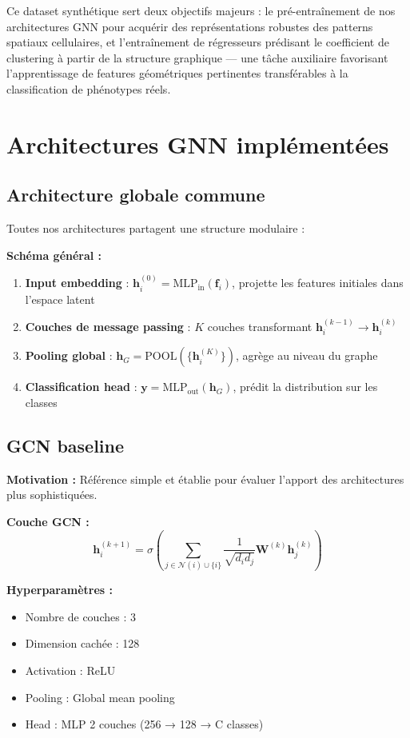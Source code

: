 Ce dataset synthétique sert deux objectifs majeurs : le pré-entraînement de nos architectures GNN pour acquérir des représentations robustes des patterns spatiaux cellulaires, et l'entraînement de régresseurs prédisant le coefficient de clustering à partir de la structure graphique — une tâche auxiliaire favorisant l'apprentissage de features géométriques pertinentes transférables à la classification de phénotypes réels.

\section{Architectures GNN implémentées}

\subsection{Architecture globale commune}

Toutes nos architectures partagent une structure modulaire :

\textbf{Schéma général :}
\begin{enumerate}
    \item \textbf{Input embedding} : $\mathbf{h}_i^{(0)} = \text{MLP}_{\text{in}}(\mathbf{f}_i)$, projette les features initiales dans l'espace latent
    \item \textbf{Couches de message passing} : $K$ couches transformant $\mathbf{h}_i^{(k-1)} \rightarrow \mathbf{h}_i^{(k)}$
    \item \textbf{Pooling global} : $\mathbf{h}_G = \text{POOL}(\{\mathbf{h}_i^{(K)}\})$, agrège au niveau du graphe
    \item \textbf{Classification head} : $\mathbf{y} = \text{MLP}_{\text{out}}(\mathbf{h}_G)$, prédit la distribution sur les classes
\end{enumerate}

\subsection{GCN baseline}

\textbf{Motivation :}
Référence simple et établie pour évaluer l'apport des architectures plus sophistiquées.

\textbf{Couche GCN :}
\[
\mathbf{h}_i^{(k+1)} = \sigma\left(\sum_{j \in \mathcal{N}(i) \cup \{i\}} \frac{1}{\sqrt{d_i d_j}} \mathbf{W}^{(k)}\mathbf{h}_j^{(k)}\right)
\]

\textbf{Hyperparamètres :}
\begin{itemize}
    \item Nombre de couches : 3
    \item Dimension cachée : 128
    \item Activation : ReLU
    \item Pooling : Global mean pooling
    \item Head : MLP 2 couches (256 → 128 → C classes)
\end{itemize}

